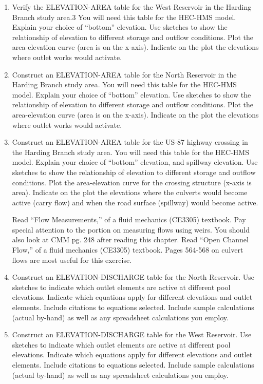 \documentclass[12pt]{article}
\begin{document}
\begin{enumerate}

\item Verify the ELEVATION-AREA table for the West Reservoir in the Harding Branch study area.3 You will need this table for the HEC-HMS model. Explain your choice of “bottom” elevation. Use sketches to show the relationship of elevation to different storage and outflow conditions. Plot the area-elevation curve (area is on the x-axis). Indicate on the plot the elevations where outlet works would activate.

\item Construct an ELEVATION-AREA table for the North Reservoir in the Harding Branch study area. You will need this table for the HEC-HMS model. Explain your choice of “bottom” elevation. Use sketches to show the relationship of elevation to different storage and outflow conditions. Plot the area-elevation curve (area is on the x-axis). Indicate on the plot the elevations where outlet works would activate.

\item Construct an ELEVATION-AREA table for the US-87 highway crossing in the Harding Branch study area. You will need this table for the HEC-HMS model. Explain your choice of “bottom” elevation, and spillway elevation. Use sketches to show the relationship of elevation to different storage and outflow conditions. Plot the area-elevation curve for the crossing structure (x-axis is area). Indicate on the plot the elevations where the culverts would become active (carry flow) and when the road surface (spillway) would become active.

Read “Flow Measurements,” of a fluid mechanics (CE3305) textbook. Pay special attention to the portion on measuring flows using weirs. You should also look at CMM pg. 248 after reading this chapter. Read “Open Channel Flow,” of a fluid mechanics (CE3305) textbook. Pages 564-568 on culvert flows are most useful for this exercise.

\item Construct an ELEVATION-DISCHARGE table for the North Reservoir. Use sketches to indicate which outlet elements are active at different pool elevations. Indicate which equations apply for different elevations and outlet elements. Include citations to equations selected. Include sample calculations (actual by-hand) as well as any spreadsheet calculations you employ.

\item Construct an ELEVATION-DISCHARGE table for the West Reservoir. Use sketches to indicate which outlet elements are active at different pool elevations. Indicate which equations apply for different elevations and outlet elements. Include citations to equations selected. Include sample calculations (actual by-hand) as well as any spreadsheet calculations you employ.


\end{enumerate}
\end{document}
